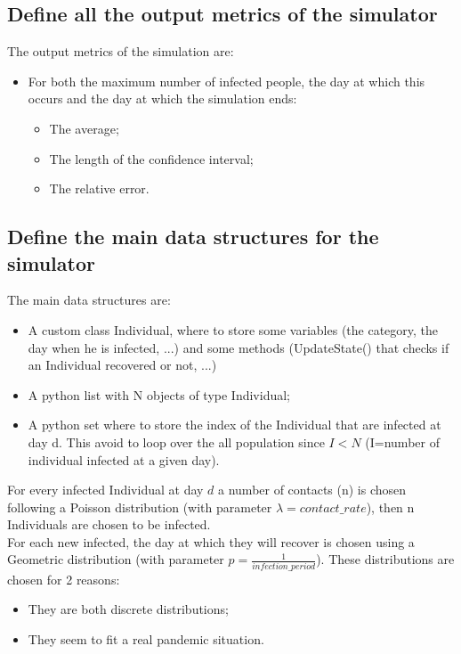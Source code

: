\documentclass[twocolumn,letterpaper]{report}
\begin{document}
{				\subsection{Define all the output metrics of the simulator}
				The output metrics of the simulation are:
				\begin{itemize}
					\item For both the maximum number of infected people, the day at which this occurs and the day at which the simulation ends:
					\begin{itemize}
						\item The average;
						\item The length of the confidence interval;
						\item The relative error.
					\end{itemize}					
			\end{itemize}
			
			\subsection{Define the main data structures for the simulator}
						The main data structures are: 
							\begin{itemize}
								\item A custom class Individual, where to store some variables (the category, the day when he is infected, ...) and some methods (UpdateState() that checks if an Individual recovered or not, ...)
								\item A python list with N objects of type Individual;
								\item A python set where to store the index of the Individual that are infected at day d. This avoid to loop over the all population since $I<N$ (I=number of individual infected at a given day).
							\end{itemize}
							For every infected Individual at day $d$ a number of contacts (n) is chosen following a Poisson distribution (with parameter $\lambda=contact\_rate$), then n Individuals are chosen to be infected. \\
							For each new infected, the day at which they will recover is chosen using a Geometric distribution (with parameter $p=\frac{1}{infection\_period}$). These distributions are chosen for 2 reasons:
							\begin{itemize}
							\item They are both discrete distributions;
							\item They seem to fit a real pandemic situation.
							\end{itemize}
					
}
\end{document}
